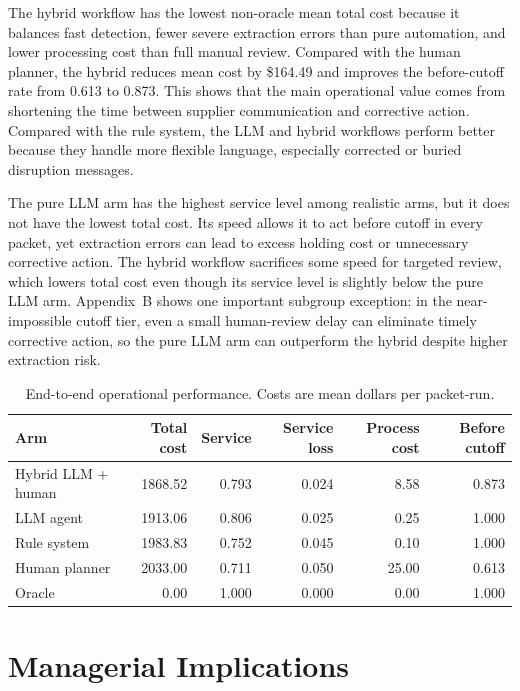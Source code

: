\documentclass[11pt]{article}
\begin{document}
The hybrid workflow has the lowest non-oracle mean total cost because it balances fast detection, fewer severe extraction errors than pure automation, and lower processing cost than full manual review. Compared with the human planner, the hybrid reduces mean cost by \$164.49 and improves the before-cutoff rate from 0.613 to 0.873. This shows that the main operational value comes from shortening the time between supplier communication and corrective action. Compared with the rule system, the LLM and hybrid workflows perform better because they handle more flexible language, especially corrected or buried disruption messages.

The pure LLM arm has the highest service level among realistic arms, but it does not have the lowest total cost. Its speed allows it to act before cutoff in every packet, yet extraction errors can lead to excess holding cost or unnecessary corrective action. The hybrid workflow sacrifices some speed for targeted review, which lowers total cost even though its service level is slightly below the pure LLM arm. Appendix~B shows one important subgroup exception: in the near-impossible cutoff tier, even a small human-review delay can eliminate timely corrective action, so the pure LLM arm can outperform the hybrid despite higher extraction risk.

\begin{table}[H]
\centering
\caption{End-to-end operational performance. Costs are mean dollars per packet-run.}
\label{tab:performance}
\small
\begin{tabular}{lrrrrr}
\toprule
Arm & Total cost & Service & Service loss & Process cost & Before cutoff \\
\midrule
Hybrid LLM + human & 1868.52 & 0.793 & 0.024 & 8.58 & 0.873 \\
LLM agent & 1913.06 & 0.806 & 0.025 & 0.25 & 1.000 \\
Rule system & 1983.83 & 0.752 & 0.045 & 0.10 & 1.000 \\
Human planner & 2033.00 & 0.711 & 0.050 & 25.00 & 0.613 \\
Oracle & 0.00 & 1.000 & 0.000 & 0.00 & 1.000 \\
\bottomrule
\end{tabular}
\end{table}

\section{Managerial Implications}
\end{document}
